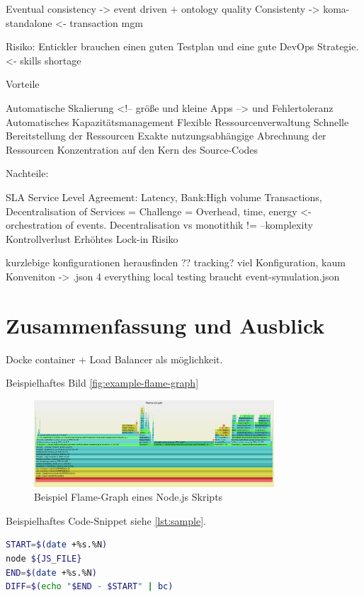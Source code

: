 \documentclass[
12pt,
english,
ngerman,
headsepline,
twoside,
openright,
numbers=noenddot,version=first
]{scrreprt}
\begin{document}
Eventual consistency -> event driven + ontology quality
Consistenty -> koma-standalone <- transaction mgm

Risiko:
Entickler brauchen einen guten Testplan und eine gute DevOps Strategie.<- skills shortage

Vorteile

Automatische Skalierung <!-- größe und kleine Apps --> und Fehlertoleranz
Automatisches Kapazitätsmanagement
Flexible Ressourcenverwaltung
Schnelle Bereitstellung der Ressourcen
Exakte nutzungsabhängige Abrechnung der Ressourcen
Konzentration auf den Kern des Source-Codes

Nachteile:

SLA Service Level Agreement: Latency, Bank:High volume Transactions,
Decentralisation of Services = Challenge = Overhead, time, energy <- orchestration of events.
Decentralisation vs monotithik != --komplexity
Kontrollverlust
Erhöhtes Lock-in Risiko

kurzlebige konfigurationen herausfinden ?? tracking?
viel Konfiguration, kaum Konveniton -> .json 4 everything
local testing braucht event-symulation.json

\chapter{Zusammenfassung und Ausblick}

Docke container + Load Balancer
als möglichkeit.


Beispielhaftes Bild \autoref{fig:example-flame-graph}

\begin{figure}[h]
\centering
\includegraphics[width=0.8\textwidth]{pics/example-flame-graph.eps}
\caption{Beispiel Flame-Graph eines Node.js Skripts}
\label{fig:example-flame-graph}
\end{figure}

Beispielhaftes Code-Snippet siehe \autoref{lst:sample}.

\begin{lstlisting}[language=bash,caption={Aufnahme der \glqq real\grqq-Zeit},label={lst:sample}]
START=$(date +%s.%N)
node ${JS_FILE}
END=$(date +%s.%N)
DIFF=$(echo "$END - $START" | bc)
\end{lstlisting}
\end{document}
